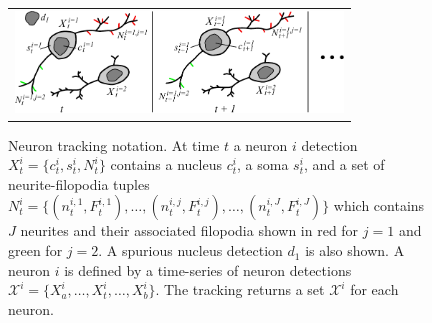 \begin{figure}[t]
  \begin{center}
       \begin{tabular}{@{\hspace{-1mm}}c}
        \includegraphics[width = 87mm] {images/neurondrawing.pdf}\\ [-2.4ex]
       \end{tabular} 
    \caption{ \footnotesize Neuron tracking
      notation.  At time $t$ a neuron $i$
      detection $X_t^i = \{ c_t^i, s_t^i, N_t^i
      \}$ contains a nucleus $c_t^i$, a soma
      $s_t^i$, and a set of neurite-filopodia
      tuples $N_t^i = \{( n_t^{i,1},F_t^{i,1}),
      \ldots,(n_t^{i,j},F_t^{i,j}), \ldots,
      (n_t^{i,J},F_t^{i,J}) \}$ which contains $J$
      neurites and their associated filopodia
      shown in red for $j=1$ and green for
      $j=2$. A spurious nucleus detection $d_1$ is
      also shown.  A neuron $i$ is defined by a
      time-series of neuron detections
      $\mathcal{X}^i =
      \{X_{a}^i,\ldots,X_t^i,\ldots,X_{b}^i \}$.
      The tracking returns a set $\mathcal{X}^i$
      for each neuron. }
    \label{fig:notation}
  \end{center}
\vspace{-8mm}
\end{figure}







\vspace{-3mm}
